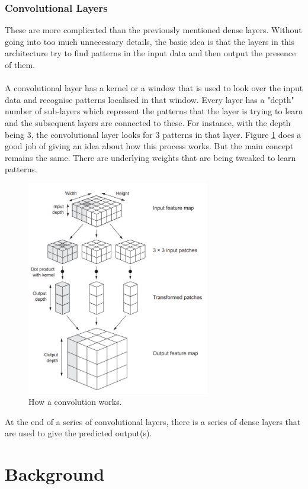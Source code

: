 \documentclass[10pt]{article}
\begin{document}
\subsubsection{Convolutional Layers}
These are more complicated than the previously mentioned dense layers. Without going into too much unnecessary details, the basic idea is that the layers in this architecture try to find patterns in the input data and then output the presence of them. 
\\\\
A convolutional layer has a kernel or a window that is used to look over the input data and recognise patterns localised in that window. Every layer has a "depth" number of sub-layers which represent the patterns that the layer is trying to learn and the subsequent layers are connected to these. For instance, with the depth being 3, the convolutional layer looks for 3 patterns in that layer. Figure \ref{fig:convnet} does a good job of giving an idea about how this process works. But the main concept remains the same. There are underlying weights that are being tweaked to learn patterns.
\begin{figure}[H]
	\centering
	\includegraphics[width=8cm]{resources/convnet.png}
	\caption{How a convolution works\cite[(Page 125, Chapter 5)]{deeplearning}.}
	\label{fig:convnet}
\end{figure}
At the end of a series of convolutional layers, there is a series of dense layers that are used to give the predicted output(s). 
\clearpage



\section{Background}
\end{document}
